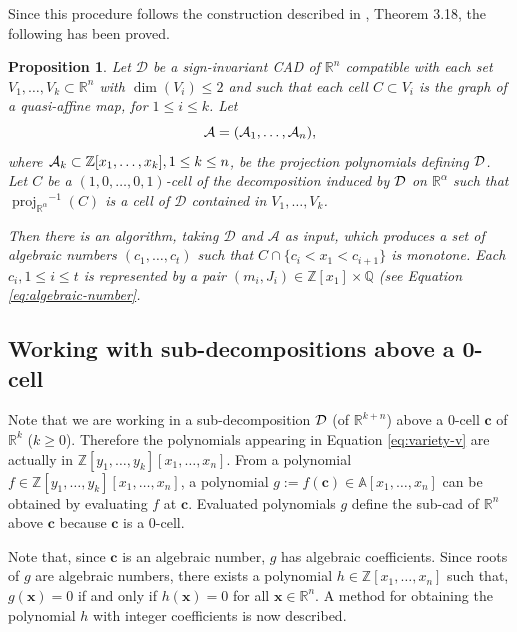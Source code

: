 \documentclass[
]{book}
\newtheorem{proposition}{Proposition}[chapter]
\theoremstyle{definition}
\theoremstyle{definition}
\theoremstyle{definition}
\theoremstyle{definition}
\theoremstyle{remark}
\begin{document}
Since this procedure follows the construction described in \citet{bgv15}, Theorem 3.18, the following has been proved.

\begin{proposition}
\protect\hypertarget{prp:monotone-sector-algorithm}{}\label{prp:monotone-sector-algorithm}Let \(\mathcal{D}\) be a sign-invariant CAD of \(\mathbb{R}^n\) compatible with each set \(V_1,\ldots,V_k \subset \mathbb{R}^n\) with \(\dim(V_i) \le 2\) and such that each cell \(C \subset V_i\) is the graph of a quasi-affine map, for \(1\le i \le k\). Let
\[
{\cal A} = ({\cal A}_1,\ldots,{\cal A}_n),
\]
where \({\cal A}_k \subset \mathbb{Z}[x_1,\ldots,x_k], 1 \le k \le n\), be the projection polynomials defining \(\cal D\).
Let \(C\) be a \((1,0,\ldots,0,1)\)-cell of the decomposition induced by \(\cal D\) on \(\mathbb{R}^{\alpha}\) such that \({\operatorname{proj}_{\mathbb{R}^{\alpha}}}^{-1}(C)\) is a cell of \(\mathcal{D}\) contained in \(V_1,\ldots,V_k\).

Then there is an algorithm, taking \(\mathcal{D}\) and \(\mathcal{A}\) as input, which produces a set of algebraic numbers \((c_1,\ldots,c_t)\) such that \(C \cap \{ c_i < x_1 < c_{i+1} \}\) is monotone. Each \(c_i, 1 \le i \le t\) is represented by a pair \((m_i, J_i) \in \mathbb{Z}[x_1] \times \mathbb{Q}\) (see Equation \eqref{eq:algebraic-number}.
\end{proposition}

\hypertarget{sec:sub-cad}{%
\subsection{Working with sub-decompositions above a 0-cell}\label{sec:sub-cad}}

Note that we are working in a sub-decomposition \(\cal D\) (of \(\mathbb{R}^{k+n}\)) above a \(0\)-cell \(\mathbf{c}\) of \(\mathbb{R}^k\) (\(k \ge 0\)). Therefore the polynomials appearing in Equation \eqref{eq:variety-v} are actually in \(\mathbb{Z}[y_1,\ldots,y_k][x_1,\ldots,x_n]\).
From a polynomial \(f \in \mathbb{Z}[y_1,\ldots,y_k][x_1,\ldots,x_n]\), a polynomial \(g := f(\mathbf{c}) \in \mathbb{A}[x_1,\ldots,x_n]\) can be obtained by evaluating \(f\) at \(\mathbf{c}\). Evaluated polynomials \(g\) define the sub-cad of \(\mathbb{R}^n\) above \(\mathbf{c}\) because \(\mathbf{c}\) is a \(0\)-cell.

Note that, since \(\mathbf{c}\) is an algebraic number, \(g\) has algebraic coefficients. Since roots of \(g\) are algebraic numbers, there exists a polynomial \(h \in \mathbb{Z}[x_1,\ldots,x_n]\) such that, \(g(\mathbf{x}) = 0\) if and only if \(h(\mathbf{x}) = 0\) for all \(\mathbf{x} \in \mathbb{R}^n\). A method for obtaining the polynomial \(h\) with integer coefficients is now described.
\end{document}
